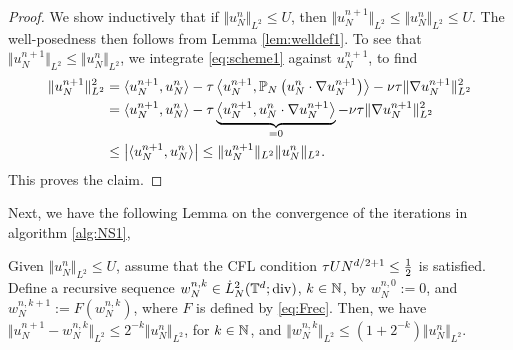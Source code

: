 \documentclass[reqno,a4paper]{amsart}
\begin{document}
\begin{proof}
We show inductively that if $\Vert u^n_N \Vert_{L^2} \le U$, then $\Vert u^{n+1}_N \Vert_{L^2} \le \Vert u^n_N \Vert_{L^2} \le U$. The well-posedness then follows from Lemma \ref{lem:welldef1}. To see that $\Vert u^{n+1}_N \Vert_{L^2} \le \Vert u^n_N \Vert_{L^2}$, we integrate \eqref{eq:scheme1} against $u^{n+1}_N$, to find
\begin{align*}
\Vert u^{n+1}_N \Vert_{L^2}^2
&=
\langle u^{n+1}_N, u^n_N \rangle
-
{\tau} \left\langle u^{n+1}_N, \mathbb{P}_N\left(u^n_N \cdot \nabla u^{n+1}_N\right) \right\rangle
-
\nu {\tau} \Vert \nabla u^{n+1}_N \Vert_{L^2}^2
\\
&=
\langle u^{n+1}_N, u^n_N \rangle
-
{\tau} \underbrace{\left\langle u^{n+1}_N, u^n_N \cdot \nabla u^{n+1}_N \right\rangle}_{=0}
-
\nu {\tau} \Vert \nabla u^{n+1}_N \Vert_{L^2}^2
\\
&\le
\left|
\langle u^{n+1}_N, u^n_N \rangle
\right|
\le
\Vert u^{n+1}_N \Vert_{L^2} \Vert u^n_N \Vert_{L^2}.
\end{align*}
This proves the claim.
\end{proof}
Next, we have the following Lemma on the convergence of the iterations in algorithm \ref{alg:NS1},
\begin{lemma} \label{lem:iter1}
Given $\Vert u^n_N \Vert_{L^2} \le U$, assume that the CFL condition ${\tau} U N^{d/2+1}\le \frac12$ is satisfied. Define a recursive sequence $w^{n,k}_N \in \dot{L}^2_N(\mathbb{T}^d;{\mathrm{div}})$, $k\in \mathbb{N}$, by $w^{n,0}_N := 0$, and $w^{n,k+1}_N := F(w^{n,k}_N)$, where $F$ is defined by \eqref{eq:Frec}. Then, we have $\Vert u^{n+1}_N - w^{n,k}_N \Vert_{L^2} \le 2^{-k} \Vert u^n_N \Vert_{L^2}$, for $k \in \mathbb{N}$, and $\Vert w^{n,k}_N \Vert_{L^2} \le (1+2^{-k}) \Vert u^n_N \Vert_{L^2}$.
\end{lemma}
\end{document}
